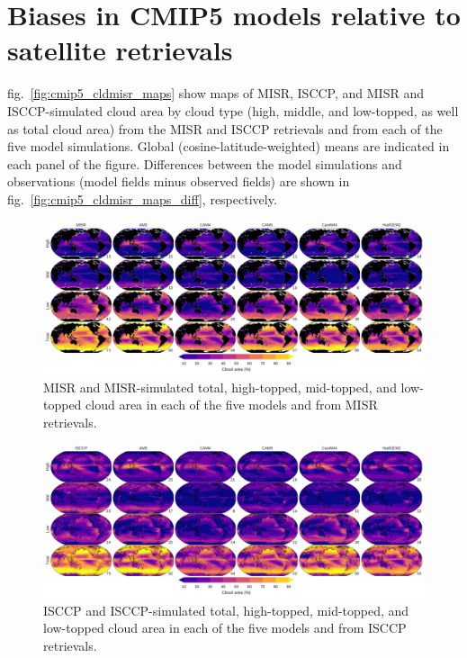 \section{Biases in CMIP5 models relative to satellite
retrievals}\label{biases-in-cmip5-models-relative-to-satellite-retrievals}

fig.~\ref{fig:cmip5_cldmisr_maps} show maps of MISR, ISCCP, and MISR and
ISCCP-simulated cloud area by cloud type (high, middle, and low-topped,
as well as total cloud area) from the MISR and ISCCP retrievals and from
each of the five model simulations. Global (cosine-latitude-weighted)
means are indicated in each panel of the figure. Differences between the
model simulations and observations (model fields minus observed fields)
are shown in fig.~\ref{fig:cmip5_cldmisr_maps_diff}, respectively.

\begin{figure}[htbp]
\centering
\includegraphics{graphics/cmip5_cldmisr.pdf}
\caption{\label{fig:cmip5_cldmisr_maps}MISR and MISR-simulated total,
high-topped, mid-topped, and low-topped cloud area in each of the five
models and from MISR retrievals.}\label{fig:cmip5ux5fcldmisrux5fmaps}
\end{figure}

\begin{figure}[htbp]
\centering
\includegraphics{graphics/cmip5_cldisccp.pdf}
\caption{\label{fig:cmip5_cldisccp_maps}ISCCP and ISCCP-simulated total,
high-topped, mid-topped, and low-topped cloud area in each of the five
models and from ISCCP retrievals.}\label{fig:cmip5ux5fcldisccpux5fmaps}
\end{figure}


